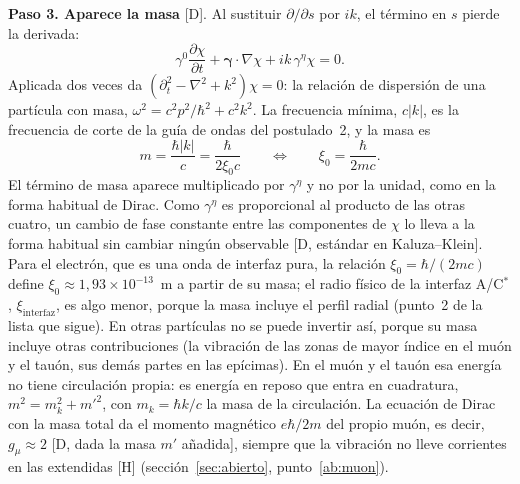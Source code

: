 \documentclass[11pt,a4paper]{article}
\newcommand{\st}[1]{\textup{[#1]}}
\newcommand{\Cst}{C\ensuremath{^{*}}}
\newcommand{\vb}[1]{\symbf{#1}}
\begin{document}
\textbf{Paso 3. Aparece la masa} \st{D}. Al sustituir $\partial/\partial s$ por $ik$, el término en $s$ pierde la derivada:
\begin{equation}
\gamma^0\frac{\partial\chi}{\partial t}+\vb{\gamma}\cdot\nabla\chi+ik\,\gamma^\eta\chi=0 .
\label{eq:paso3}
\end{equation}
Aplicada dos veces da $(\partial_t^2-\nabla^2+k^2)\chi=0$: la relación de dispersión de una partícula con masa, $\omega^2=c^2p^2/\hbar^2+c^2k^2$. La frecuencia mínima, $c|k|$, es la frecuencia de corte de la guía de ondas del postulado~2, y la masa es
\begin{equation}
m=\frac{\hbar|k|}{c}=\frac{\hbar}{2\xi_0c}
\qquad\Longleftrightarrow\qquad
\xi_0=\frac{\hbar}{2mc} .
\label{eq:masa}
\end{equation}
El término de masa aparece multiplicado por $\gamma^\eta$ y no por la unidad, como en la forma habitual de Dirac. Como $\gamma^\eta$ es proporcional al producto de las otras cuatro, un cambio de fase constante entre las componentes de $\chi$ lo lleva a la forma habitual sin cambiar ningún observable \st{D, estándar en Kaluza--Klein}. Para el electrón, que es una onda de interfaz pura, la relación $\xi_0=\hbar/(2mc)$ define $\xi_0\approx1,93\times10^{-13}$~m a partir de su masa; el radio físico de la interfaz A/\Cst, $\xi_{\mathrm{interfaz}}$, es algo menor, porque la masa incluye el perfil radial (punto~2 de la lista que sigue). En otras partículas no se puede invertir así, porque su masa incluye otras contribuciones (la vibración de las zonas de mayor índice en el muón y el tauón, sus demás partes en las epícimas). En el muón y el tauón esa energía no tiene circulación propia: es energía en reposo que entra en cuadratura, $m^2=m_k^2+m'^2$, con $m_k=\hbar k/c$ la masa de la circulación. La ecuación de Dirac con la masa total da el momento magnético $e\hbar/2m$ del propio muón, es decir, $g_\mu\approx2$ \st{D, dada la masa $m'$ añadida}, siempre que la vibración no lleve corrientes en las extendidas \st{H} (sección~\ref{sec:abierto}, punto~\ref{ab:muon}).
\end{document}
